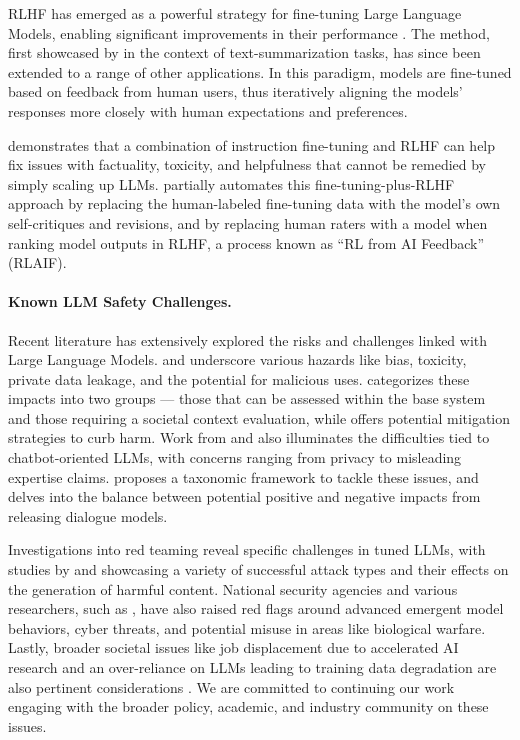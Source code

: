 \documentclass{article}
\begin{document}
RLHF has emerged as a powerful strategy for fine-tuning Large Language Models, enabling significant improvements in their performance \citep{christiano-etal-2017-deep}. The method, first showcased by \citet{stienon2020learning} in the context of text-summarization tasks, has since been extended to a range of other applications. In this paradigm, models are fine-tuned based on feedback from human users, thus iteratively aligning the models' responses more closely with human expectations and preferences.

\citet{ouyang2022training} demonstrates that a combination of instruction fine-tuning and RLHF can help fix issues with factuality, toxicity, and helpfulness that cannot be remedied by simply scaling up LLMs. \citet{bai2022constitutional} partially automates this fine-tuning-plus-RLHF approach by replacing the human-labeled fine-tuning data with the model's own self-critiques and revisions, and by replacing human raters with 
a model when ranking model outputs in RLHF, a process known as ``RL from AI Feedback'' (RLAIF).

\paragraph{Known LLM Safety Challenges.}
\label{sec:safety_background}
Recent literature has extensively explored the risks and challenges linked with Large Language Models. \cite{bender2021dangers} and \citet{weidinger2021ethical} underscore various hazards like bias, toxicity, private data leakage, and the potential for malicious uses. \citet{solaiman2023evaluating} categorizes these impacts into two groups --- those that can be assessed within the base system and those requiring a societal context evaluation, while \citet{kumar2022language} offers potential mitigation strategies to curb harm. Work from \citet{roller2020open} and \citet{dinan2021anticipating} also illuminates the difficulties tied to chatbot-oriented LLMs, with concerns ranging from privacy to misleading expertise claims. \citet{deng2023recent}  proposes a taxonomic framework to tackle these issues, and \citet{bergman2022guiding} delves into the balance between potential positive and negative impacts from releasing dialogue models.

Investigations into red teaming reveal specific challenges in tuned LLMs, with studies by \citet{ganguli2022red} and \citet{zhuo2023exploring} showcasing a variety of successful attack types and their effects on the generation of harmful content. National security agencies and various researchers, such as \citep{mialon2023augmented}, have also raised red flags around advanced emergent model behaviors, cyber threats, and potential misuse in areas like biological warfare. Lastly, broader societal issues like job displacement due to accelerated AI research and an over-reliance on LLMs leading to training data degradation are also pertinent considerations \citep{acemoglu2018artificial,autor2018automation,webb2019impact, shumailov2023curse}. We are committed to continuing our work engaging with the broader policy, academic, and industry community on these issues. 
\end{document}
